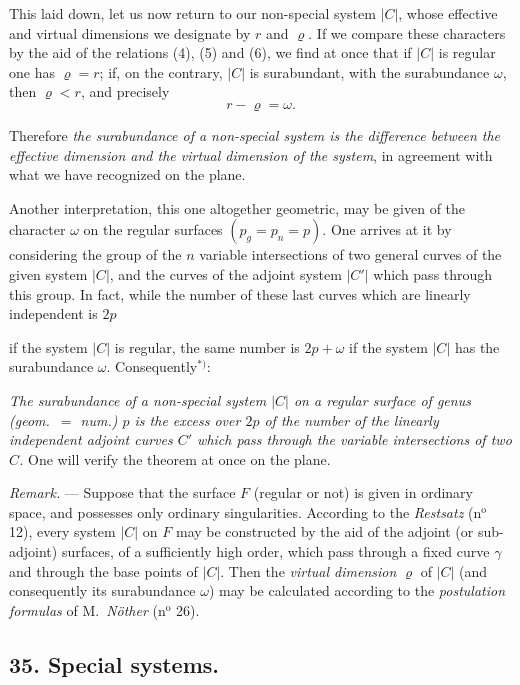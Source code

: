 \documentclass{article}
\begin{document}
This laid down, let us now return to our non-special system $|C|$, whose effective and virtual dimensions we designate by $r$ and $\varrho$. If we compare these characters by the aid of the relations (4), (5) and (6), we find at once that if $|C|$ is regular one has $\varrho = r$; if, on the contrary, $|C|$ is surabundant, with the surabundance $\omega$, then $\varrho < r$, and precisely
\[ r - \varrho = \omega. \]

Therefore \emph{the surabundance of a non-special system is the difference between the effective dimension and the virtual dimension of the system}, in agreement with what we have recognized on the plane.

Another interpretation, this one altogether geometric, may be given of the character $\omega$ on the regular surfaces $(p_{g} = p_{n} = p)$. One arrives at it by considering the group of the $n$ variable intersections of two general curves of the given system $|C|$, and the curves of the adjoint system $|C'|$ which pass through this group. In fact, while the number of these last curves which are linearly independent is $2p$

if the system $|C|$ is regular, the same number is $2p + \omega$ if the system $|C|$ has the surabundance $\omega$. Consequently${}^{*)}$:

\emph{The surabundance of a non-special system $|C|$ on a regular surface of genus (geom.\ $=$ num.) $p$ is the excess over $2p$ of the number of the linearly independent adjoint curves $C'$ which pass through the variable intersections of two $C$.} One will verify the theorem at once on the plane.

\emph{Remark.} --- Suppose that the surface $F$ (regular or not) is given in ordinary space, and possesses only ordinary singularities. According to the \emph{Restsatz} (n${}^{\text{o}}$ 12), every system $|C|$ on $F$ may be constructed by the aid of the adjoint (or sub-adjoint) surfaces, of a sufficiently high order, which pass through a fixed curve $\gamma$ and through the base points of $|C|$. Then the \emph{virtual dimension} $\varrho$ of $|C|$ (and consequently its surabundance $\omega$) may be calculated according to the \emph{postulation formulas} of M.\ \emph{Nöther} (n${}^{\text{o}}$ 26).

\subsection*{35. Special systems.}
\end{document}
